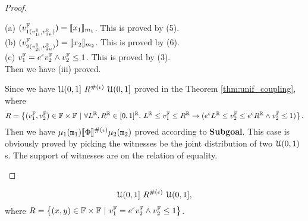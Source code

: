 \documentclass[a4paper,11pt]{article}
\begin{document}
\begin{proof}
\begin{itemize}
\begin{subproof}
	(a)	$(v^{\mathbb{F}}_{1(v^{\mathbb{R}}_{1l}, v^{\mathbb{R}}_{1u})}) = \llbracket x_1 \rrbracket_{m_1}$.
	This is proved by (5).
	\\
	(b) $(v^{\mathbb{F}}_{2(v^{\mathbb{R}}_{2l}, v^{\mathbb{R}}_{2u})}) = \llbracket x_2 \rrbracket_{m_2}$.
	This is proved by (6).
	\\
	(c) $v^{\mathbb{F}}_1  = e^{\epsilon}  v^{\mathbb{F}}_2 
		\land v^{\mathbb{F}}_2 \leq 1$.
	This is proved by (3).
	\\
	Then we have (iii) proved. 
	\end{subproof}
	Since we have $\mathcal{U}(0,1] ~ R^{\#(\epsilon)} ~ \mathcal{U}(0,1]$ proved in the Theorem \ref{thm:unif_coupling},
	where 
	\[
		R = 
		\left \{(v^{\mathbb{F}}_1, v^{\mathbb{F}}_2) \in \mathbb{F} \times \mathbb{F} 
		~|~
		\forall L^{\mathbb{R}}, R^{\mathbb{R}} \in [0,1]^{\mathbb{R}}. ~
		L^{\mathbb{R}} \leq v^{\mathbb{F}}_1 \leq R^{\mathbb{R}}
		\rightarrow
		(e^{\epsilon} L^{\mathbb{R}} \leq v^{\mathbb{F}}_2 \leq 	e^{\epsilon} R^{\mathbb{R}}
		\land v^{\mathbb{F}}_2 \leq 1)
		\right \}.
	\]	%
	Then we have $\mu_1(\mathtt{m}_1) \llbracket \Phi \rrbracket^{\#(\epsilon)} \mu_2(\mathtt{m}_2)$ proved according to \textbf{Subgoal}.
	This case is obviously proved by picking the witnesses be the joint distribution of two $\mathcal{U}(0, 1)$s.
	The support of witnesses are on the relation of equality.
	\end{itemize}
\end{proof}
%
\newpage
\begin{thm}
\label{thm:unif_coupling}
%
$${\mathcal{U}(0,1]} ~ R^{\#(\epsilon)} ~ {\mathcal{U}(0,1]},$$
%
where
	$	R = 
		\left \{(x, y) \in {\mathbb{F}} \times {\mathbb{F}} 
		~|~
		v^{\mathbb{F}}_1  = e^{\epsilon}  v^{\mathbb{F}}_2 
		\land v^{\mathbb{F}}_2 \leq 1
		\right \}
		$.
\end{thm}
%
\end{document}
